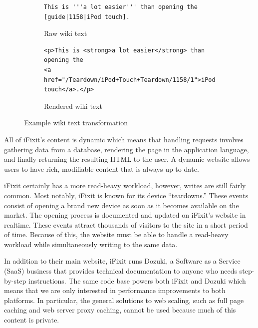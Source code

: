 \documentclass[12pt]{ucthesis}
\begin{document}
\begin{figure}[hbtp]
\begin{subfigure}[b]{1.0\textwidth}
\begin{ssp}
\begin{verbatim}
This is '''a lot easier''' than opening the [guide|1158|iPod touch].
\end{verbatim}
\caption{Raw wiki text}
\label{fig:wikiTextTransformationRaw}
\end{ssp}
\end{subfigure}

\vspace{2em}
\begin{subfigure}[b]{1.0\textwidth}
\begin{ssp}
\begin{verbatim}
<p>This is <strong>a lot easier</strong> than opening the
<a href="/Teardown/iPod+Touch+Teardown/1158/1">iPod touch</a>.</p>
\end{verbatim}
\caption{Rendered wiki text}
\label{fig:wikiTextTransformationRendered}
\end{ssp}
\end{subfigure}

\caption{Example wiki text transformation}
\label{fig:wikiTextTransformation}
\end{figure}

All of \textsf{iFixit}'s content is dynamic which means that handling requests involves gathering data from a database, rendering the page in the application language, and finally returning the resulting HTML to the user.
A dynamic website allows users to have rich, modifiable content that is always up-to-date.

\textsf{iFixit} certainly has a more read-heavy workload, however, writes are still fairly common.
Most notably, \textsf{iFixit} is known for its device ``teardowns.''
These events consist of opening a brand new device as soon as it becomes available on the market.
The opening process is documented and updated on \textsf{iFixit}'s website in realtime.
These events attract thousands of visitors to the site in a short period of time.
Because of this, the website must be able to handle a read-heavy workload while simultaneously writing to the same data.

In addition to their main website, \textsf{iFixit} runs \textsf{Dozuki}, a Software as a Service (SaaS) business that provides technical documentation to anyone who needs step-by-step instructions.
The same code base powers both \textsf{iFixit} and \textsf{Dozuki} which means that we are only interested in performance improvements to both platforms.
In particular, the general solutions to web scaling, such as full page caching and web server proxy caching, cannot be used because much of this content is private.
\end{document}
